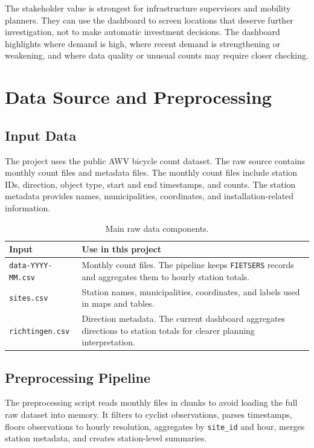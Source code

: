 \documentclass[11pt]{article}
\newcommand{\code}[1]{\texttt{#1}}
\begin{document}
The stakeholder value is strongest for infrastructure supervisors and mobility planners. They can use the dashboard to screen locations that deserve further investigation, not to make automatic investment decisions. The dashboard highlights where demand is high, where recent demand is strengthening or weakening, and where data quality or unusual counts may require closer checking.

\clearpage
\section{Data Source and Preprocessing}

\subsection{Input Data}

The project uses the public AWV bicycle count dataset. The raw source contains monthly count files and metadata files. The monthly count files include station IDs, direction, object type, start and end timestamps, and counts. The station metadata provides names, municipalities, coordinates, and installation-related information.

\begin{table}[htbp]
\centering
\caption{Main raw data components.}
\small
\begin{tabularx}{0.95\textwidth}{lX}
\toprule
\textbf{Input} & \textbf{Use in this project} \\
\midrule
\code{data-YYYY-MM.csv} & Monthly count files. The pipeline keeps \code{FIETSERS} records and aggregates them to hourly station totals. \\
\code{sites.csv} & Station names, municipalities, coordinates, and labels used in maps and tables. \\
\code{richtingen.csv} & Direction metadata. The current dashboard aggregates directions to station totals for clearer planning interpretation. \\
\bottomrule
\end{tabularx}
\end{table}

\subsection{Preprocessing Pipeline}

The preprocessing script reads monthly files in chunks to avoid loading the full raw dataset into memory. It filters to cyclist observations, parses timestamps, floors observations to hourly resolution, aggregates by \code{site\_id} and hour, merges station metadata, and creates station-level summaries.
\end{document}
